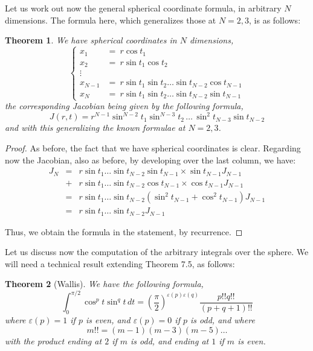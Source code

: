 \documentclass[12pt]{amsbook}
\newtheorem{theorem}{Theorem}[chapter]
\begin{document}
Let us work out now the general spherical coordinate formula, in arbitrary $N$ dimensions. The formula here, which generalizes those at $N=2,3$, is as follows:


\begin{theorem}
We have spherical coordinates in $N$ dimensions,
$$\begin{cases}
x_1\!\!\!&=\ r\cos t_1\\
x_2\!\!\!&=\ r\sin t_1\cos t_2\\
\vdots\\
x_{N-1}\!\!\!&=\ r\sin t_1\sin t_2\ldots\sin t_{N-2}\cos t_{N-1}\\
x_N\!\!\!&=\ r\sin t_1\sin t_2\ldots\sin t_{N-2}\sin t_{N-1}
\end{cases}$$
the corresponding Jacobian being given by the following formula,
$$J(r,t)=r^{N-1}\sin^{N-2}t_1\sin^{N-3}t_2\,\ldots\,\sin^2t_{N-3}\sin t_{N-2}$$
and with this generalizing the known formulae at $N=2,3$.
\end{theorem}

\begin{proof}
As before, the fact that we have spherical coordinates is clear. Regarding now the Jacobian, also as before, by developing over the last column, we have:
\begin{eqnarray*}
J_N
&=&r\sin t_1\ldots\sin t_{N-2}\sin t_{N-1}\times \sin t_{N-1}J_{N-1}\\
&+&r\sin t_1\ldots \sin t_{N-2}\cos t_{N-1}\times\cos t_{N-1}J_{N-1}\\
&=&r\sin t_1\ldots\sin t_{N-2}(\sin^2 t_{N-1}+\cos^2 t_{N-1})J_{N-1}\\
&=&r\sin t_1\ldots\sin t_{N-2}J_{N-1}
\end{eqnarray*}

Thus, we obtain the formula in the statement, by recurrence.
\end{proof}

Let us discuss now the computation of the arbitrary integrals over the sphere. We will need a technical result extending Theorem 7.5, as follows:


\begin{theorem}[Wallis]
We have the following formula,
$$\int_0^{\pi/2}\cos^pt\sin^qt\,dt=\left(\frac{\pi}{2}\right)^{\varepsilon(p)\varepsilon(q)}\frac{p!!q!!}{(p+q+1)!!}$$
where $\varepsilon(p)=1$ if $p$ is even, and $\varepsilon(p)=0$ if $p$ is odd, and where
$$m!!=(m-1)(m-3)(m-5)\ldots$$
with the product ending at $2$ if $m$ is odd, and ending at $1$ if $m$ is even.
\end{theorem}
\end{document}
